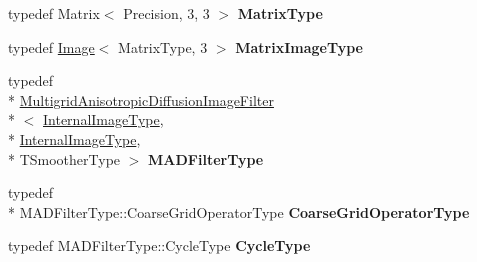 \begin{DoxyCompactItemize}
\item 
\hypertarget{classitk_1_1_v_e_d_multigrid_image_filter_a2bb0bd96e8015b5411cf8ea427015623}{typedef Matrix$<$ Precision, 3, 3 $>$ {\bfseries Matrix\-Type}}\label{classitk_1_1_v_e_d_multigrid_image_filter_a2bb0bd96e8015b5411cf8ea427015623}

\item 
\hypertarget{classitk_1_1_v_e_d_multigrid_image_filter_a6246de6b8751b51198accf31b3809428}{typedef \hyperlink{class_image}{Image}$<$ Matrix\-Type, 3 $>$ {\bfseries Matrix\-Image\-Type}}\label{classitk_1_1_v_e_d_multigrid_image_filter_a6246de6b8751b51198accf31b3809428}

\item 
\hypertarget{classitk_1_1_v_e_d_multigrid_image_filter_a85d338d00e13192258181aa2af45d331}{typedef \\*
\hyperlink{classitk_1_1_multigrid_anisotropic_diffusion_image_filter}{Multigrid\-Anisotropic\-Diffusion\-Image\-Filter}\\*
$<$ \hyperlink{class_image}{Internal\-Image\-Type}, \\*
\hyperlink{class_image}{Internal\-Image\-Type}, \\*
T\-Smoother\-Type $>$ {\bfseries M\-A\-D\-Filter\-Type}}\label{classitk_1_1_v_e_d_multigrid_image_filter_a85d338d00e13192258181aa2af45d331}

\item 
\hypertarget{classitk_1_1_v_e_d_multigrid_image_filter_a266c29175fe64dfb7020ecac3f29c9a6}{typedef \\*
M\-A\-D\-Filter\-Type\-::\-Coarse\-Grid\-Operator\-Type {\bfseries Coarse\-Grid\-Operator\-Type}}\label{classitk_1_1_v_e_d_multigrid_image_filter_a266c29175fe64dfb7020ecac3f29c9a6}

\item 
\hypertarget{classitk_1_1_v_e_d_multigrid_image_filter_a18f9a5f1db18950100ab4805661d9634}{typedef M\-A\-D\-Filter\-Type\-::\-Cycle\-Type {\bfseries Cycle\-Type}}\label{classitk_1_1_v_e_d_multigrid_image_filter_a18f9a5f1db18950100ab4805661d9634}

\end{DoxyCompactItemize}
